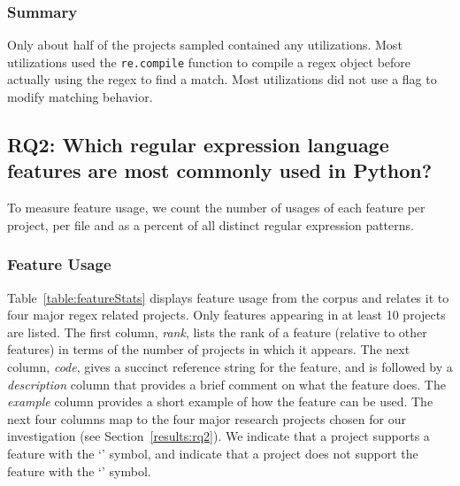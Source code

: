

% 


\subsubsection{Summary}

Only about half of the projects sampled contained any utilizations.  Most utilizations used the {\tt re.compile} function to compile a regex object before actually using the regex to find a match.  Most utilizations did not use a flag to modify matching behavior.  
\leavevmode\color{black}
\subsection{RQ2: Which regular expression language features are most commonly used in Python?}
\label{results:re2}

To measure feature usage, we  count the number of usages of each feature per project, per file and as a percent of all distinct regular expression patterns.



\subsubsection{Feature Usage}
\label{sec:featureUsage}
Table~\ref{table:featureStats} displays feature usage from the corpus and relates it to four major regex related projects. Only features appearing in at least 10 projects are listed.
The first column, \emph{rank}, lists the rank of a feature (relative to other features) in terms of the number of projects in which it appears. The next column, \emph{code}, gives a succinct reference string for the feature, and is followed by a \emph{description} column that provides a brief comment on what the feature does.  The \emph{example} column provides a short example of how the feature can be used.
The next four columns map to the four major research projects chosen for our investigation (see Section~\ref{results:rq2}).  We indicate that a project supports a feature with the `\yes' symbol, and indicate that a project does not support the feature with the `\no' symbol.


